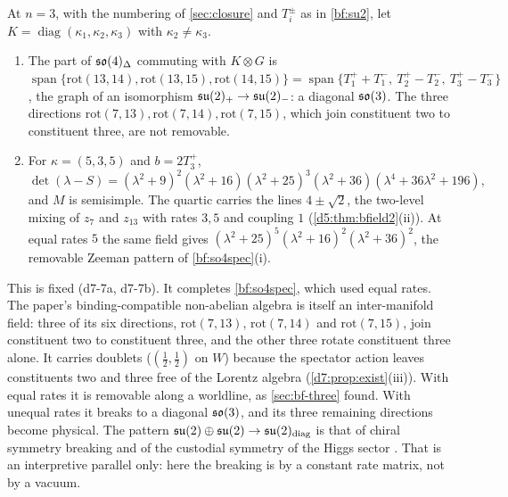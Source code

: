\begin{proposition}
\label{d7:prop:so4unequal}
At $n=3$, with the numbering of \cref{sec:closure} and $T^\pm_i$ as in \cref{bf:su2}, let $K=\operatorname{diag}(\kappa_1,\kappa_2,\kappa_3)$ with
$\kappa_2\neq\kappa_3$.
\begin{enumerate}[label=(\roman*),leftmargin=2.2em]
\item The part of $\mathfrak{so}(4)_\Delta$ commuting with $K\otimes G$ is $\operatorname{span}\{\mathrm{rot}(13,14),\mathrm{rot}(13,15),\mathrm{rot}(14,15)\}
=\operatorname{span}\{T^+_1+T^-_1,\ T^+_2-T^-_2,\ T^+_3-T^-_3\}$, the graph of an isomorphism $\mathfrak{su}(2)_+\to\mathfrak{su}(2)_-$: a diagonal $\mathfrak{so}(3)$. The three directions
$\mathrm{rot}(7,13),\mathrm{rot}(7,14),\mathrm{rot}(7,15)$, which join constituent two to constituent three, are not removable.
\item For $\kappa=(5,3,5)$ and $b=2T^+_3$,
\[
\det(\lambda-S)=(\lambda^2+9)^2(\lambda^2+16)(\lambda^2+25)^3(\lambda^2+36)(\lambda^4+36\lambda^2+196),
\]
and $M$ is semisimple. The quartic carries the lines $4\pm\sqrt2$, the two-level mixing of $z_7$ and $z_{13}$ with rates $3,5$ and coupling $1$
(\cref{d5:thm:bfield2}(ii)). At equal rates $5$ the same field gives $(\lambda^2+25)^5(\lambda^2+16)^2(\lambda^2+36)^2$, the removable Zeeman pattern
of \cref{bf:so4spec}(i).
\end{enumerate}
\end{proposition}

This is fixed (d7-7a, d7-7b). It completes \cref{bf:so4spec}, which used equal rates. The paper's binding-compatible non-abelian algebra is
itself an inter-manifold field: three of its six directions, $\mathrm{rot}(7,13)$, $\mathrm{rot}(7,14)$ and $\mathrm{rot}(7,15)$, join constituent two to constituent three, and the other three rotate constituent three alone. It carries doublets ($(\tfrac12,\tfrac12)$ on
$W$) because the spectator action leaves constituents two and three free of the Lorentz algebra (\cref{d7:prop:exist}(iii)). With equal rates it is
removable along a worldline, as \cref{sec:bf-three} found. With unequal rates it breaks to a diagonal $\mathfrak{so}(3)$, and its three remaining directions
become physical. The pattern $\mathfrak{su}(2)\oplus\mathfrak{su}(2)\to\mathfrak{su}(2)_{\rm diag}$ is that of chiral symmetry breaking and of the custodial symmetry of the Higgs
sector \cite{SikivieEtAl80}. That is an interpretive parallel only: here the breaking is by a constant rate matrix, not by a vacuum.

